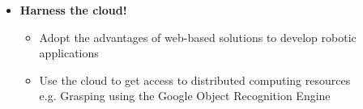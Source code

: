 \documentclass[hyperref={pdfpagelayout=SinglePage}]{beamer}
\begin{document}
\begin{frame}[allowframebreaks]
\begin{itemize}
		\item \textbf{Harness the cloud!}
			\begin{itemize}
			\item Adopt the advantages of web-based solutions to develop robotic applications
			\item Use the cloud to get access to distributed computing resources \\ e.g. Grasping using the Google Object Recognition Engine
			\end{itemize}
		\end{itemize}			
	\end{frame}
\end{document}
